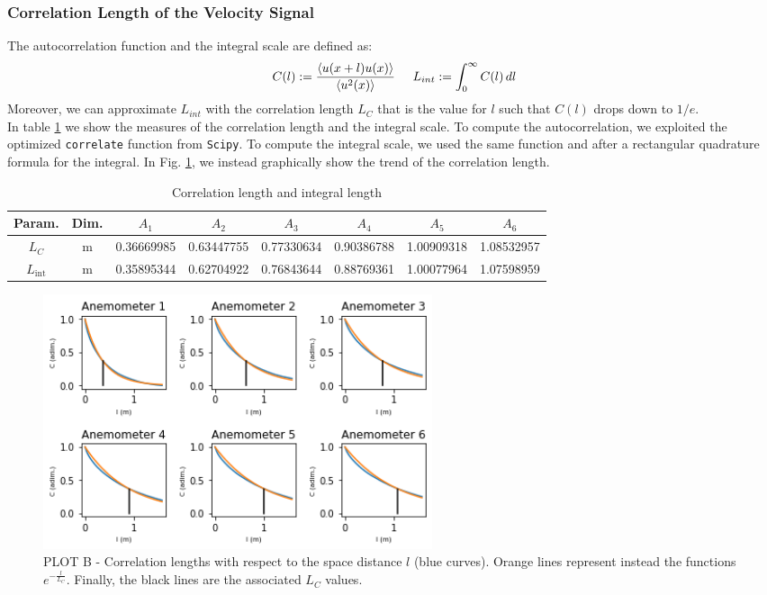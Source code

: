 \documentclass[11pt,titlepage]{article}
\begin{document}
\subsubsection{Correlation Length of the Velocity Signal} \label{correlation_length_of_the_velocity}
The autocorrelation function and the integral scale are defined as:
\begin{equation*}
	C(l):=\frac{\left< u(x+l)u(x)\right>}{\left< u^2(x)\right>} \hspace{5mm} L_{int}:= \int_0^\infty C(l) \, dl
\end{equation*}
Moreover, we can approximate $L_{int}$ with the correlation length $L_C$ that is the value for $l$ such that $C(l)$ drops down to $1/e$. \\
In table \ref{tab2} we show the measures of the correlation length and the integral scale. To compute the autocorrelation, we exploited the optimized \texttt{correlate} function from \texttt{Scipy}. To compute the integral scale, we used the same function and after a rectangular quadrature formula for the integral.  
In Fig. \ref{fig2}, we instead graphically show the trend of the correlation length. \\
\begin{table}[h]
\centering
\caption{Correlation length and integral length} \label{tab2}
    \begin{tabular}{ | c | c | c | c | c | c | c | c |}
    \hline
    Param. & Dim. & $A_1$ & $A_2$ & $A_3$ & $A_4$ & $A_5$ & $A_6$ \\
    \hline
    $L_C$ & m & 0.36669985& 0.63447755& 0.77330634& 0.90386788 &1.00909318 &1.08532957 \\
    \hline
    $L_\mathrm{int}$ &m & 0.35895344& 0.62704922& 0.76843644& 0.88769361 &1.00077964 &1.07598959 \\
    \hline
    \end{tabular}
\end{table}
	\begin{center} 
	\begin{figure} [h]
		\centering
		\includegraphics[width = 4.5in]{./figures/ex1_2.png}
		\caption{PLOT B - Correlation lengths with respect to the space distance $l$ (blue curves). Orange lines represent instead the functions $e^{-\frac{l}{L_C}}$. Finally, the black lines are the associated $L_C$ values.}
		\label{fig2}
	\end{figure}
\end{center}
\end{document}
